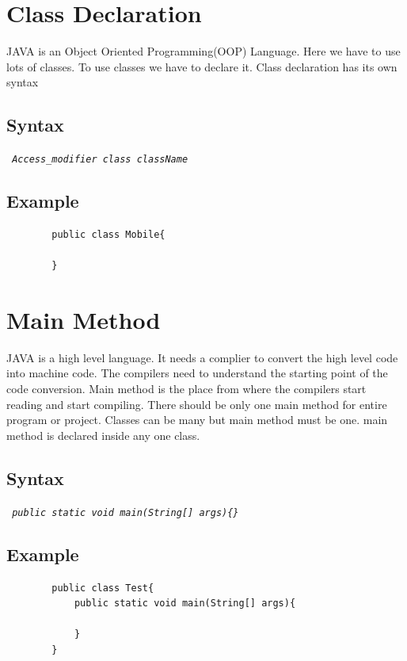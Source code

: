 \documentclass[openany]{book}  %
\begin{document}
\section{Class Declaration}
JAVA is an Object Oriented Programming(OOP) Language. Here we have to use lots of classes. To use classes we have to declare it. Class declaration has its own syntax
% 
% 
\subsection{Syntax}
\begin{center}
    \tt{
        \textit{Access\_modifier class className}
    }
\end{center}
% 
% 
\subsection{Example}
\begin{center}
    \begin{verbatim}
        public class Mobile{

        }
    \end{verbatim}
\end{center}

% 
% 
\section{Main Method}
JAVA is a high level language. It needs a complier to convert the high level code into machine code. The compilers need to understand the starting point of the code conversion.
Main method is the place from where the compilers start reading and start compiling. There should be only one main method for entire program or project. Classes can be many but main method
must be one. main method is declared inside any one class.
% 
% 
\subsection{Syntax}
\begin{center}
    \tt{
        \textit{public static void main(String[] args)\{\}}
    }
\end{center}
% 
% 
\subsection{Example}
\begin{center}
    \begin{verbatim}
        public class Test{
            public static void main(String[] args){

            }
        }
    \end{verbatim}
\end{center}
\end{document}
